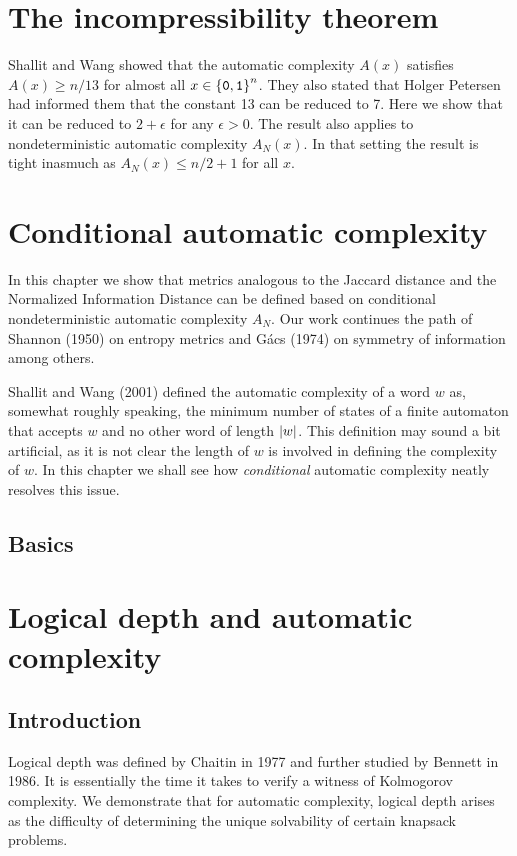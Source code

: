 \chapter{The incompressibility theorem}\label{chap:FMS}

	Shallit and Wang showed that the automatic complexity $A(x)$ satisfies $A(x)\ge n/13$ for almost all $x\in{\{\mathtt{0},\mathtt{1}\}}^n$.
	They also stated that Holger Petersen had informed them that the constant 13 can be reduced to 7.
	Here we show that it can be reduced to $2+\epsilon$ for any $\epsilon>0$.
	The result also applies to nondeterministic automatic complexity $A_N(x)$.
	In that setting the result is tight inasmuch as $A_N(x)\le n/2+1$ for all $x$.

\chapter{Conditional automatic complexity}\label{chap:metrics}

	In this chapter we show that metrics analogous to the Jaccard distance and the Normalized Information Distance can be defined based on conditional nondeterministic automatic complexity $A_N$.
	Our work continues the path of Shannon (1950) on entropy metrics and G\'acs (1974) on symmetry of information among others.

	Shallit and Wang (2001) defined the automatic complexity of a word $w$ as, somewhat roughly speaking, the minimum number of states of a finite automaton that accepts $w$ and no other word of length $\lvert w\rvert$.
	This definition may sound a bit artificial, as it is not clear the length of $w$ is involved in defining the complexity of $w$.
	In this chapter we shall see how \emph{conditional} automatic complexity neatly resolves this issue.


\section{Basics}

\chapter{Logical depth and automatic complexity}\label{chap:depth}

\section{Introduction}

	Logical depth was defined by Chaitin in 1977 \cite{5390997} and further studied by Bennett in 1986. It is essentially the time it takes to verify a witness of Kolmogorov complexity.
	We demonstrate that for automatic complexity, logical depth arises as the difficulty of determining the unique solvability of certain knapsack problems.

